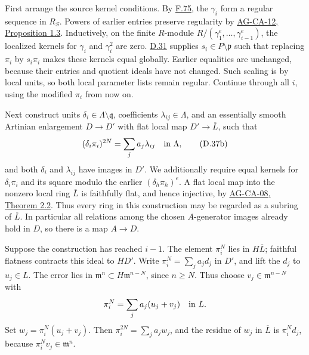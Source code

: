 \documentclass[11pt,a4paper,openany]{report}
\begin{document}
First arrange the source kernel conditions. By \hyperref[AG-RG-S05-algebra-lemma-regular-sequence-in-polynomial-ring]{F.75}, the \(\gamma_i\) form a regular sequence in \(R_S\). Powers of earlier entries preserve regularity by \href{https://github.com/KokunoYumeto/open-math-courses/blob/d02d0a3669f42579db037cd44de1d113fdd770a1/docs/courses/AG-CA/src/regular-sequences-depth-and-cohen-macaulay-modules.md}{AG-CA-12, Proposition 1.3}. Inductively, on the finite \(R\)-module \(R/(\gamma_1^e,\ldots,\gamma_{i-1}^e)\), the localized kernels for \(\gamma_i\) and \(\gamma_i^2\) are zero. \hyperref[AG-RG-S05-smoothing-lemma-ogoma]{D.31} supplies \(s_i\in P\setminus\mathfrak p\) such that replacing \(\pi_i\) by \(s_i\pi_i\) makes these kernels equal globally. Earlier equalities are unchanged, because their entries and quotient ideals have not changed. Such scaling is by local units, so both local parameter lists remain regular. Continue through all \(i\), using the modified \(\pi_i\) from now on.

Next construct units \(\delta_i\in\Lambda\setminus\mathfrak q\), coefficients \(\lambda_{ij}\in\Lambda\), and an essentially smooth Artinian enlargement \(D\to D'\) with flat local map \(D'\to\overline L\), such that \[
(\delta_i\pi_i)^{2N}=\sum_j a_j\lambda_{ij}
\quad\hbox{in }\Lambda,
\tag{D.37b}
\] and both \(\delta_i\) and \(\lambda_{ij}\) have images in \(D'\). We additionally require equal kernels for \(\delta_i\pi_i\) and its square modulo the earlier \((\delta_h\pi_h)^e\). A flat local map into the nonzero local ring \(\overline L\) is faithfully flat, and hence injective, by \href{https://github.com/KokunoYumeto/open-math-courses/blob/d02d0a3669f42579db037cd44de1d113fdd770a1/docs/courses/AG-CA/src/faithful-flatness-and-the-local-criterion-for-flatness.md}{AG-CA-08, Theorem 2.2}. Thus every ring in this construction may be regarded as a subring of \(\overline L\). In particular all relations among the chosen \(A\)-generator images already hold in \(D\), so there is a map \(A\to D\).

Suppose the construction has reached \(i-1\). The element \(\pi_i^N\) lies in \(H\overline L\); faithful flatness contracts this ideal to \(HD'\). Write \(\pi_i^N=\sum_j a_jd_j\) in \(D'\), and lift the \(d_j\) to \(u_j\in L\). The error lies in \(\mathfrak m^n\subset H\mathfrak m^{n-N}\), since \(n\ge N\). Thus choose \(v_j\in\mathfrak m^{n-N}\) with \[
\pi_i^N=\sum_j a_j(u_j+v_j)\quad\hbox{in }L.
\] Set \(w_j=\pi_i^N(u_j+v_j)\). Then \(\pi_i^{2N}=\sum_j a_jw_j\), and the residue of \(w_j\) in \(\overline L\) is \(\pi_i^Nd_j\), because \(\pi_i^Nv_j\in\mathfrak m^n\).
\end{document}
